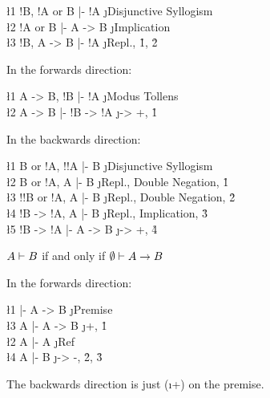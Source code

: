 \documentclass[class=cs245,notes,leqno]{agony}
\begin{document}
\begin{theorem}
\end{theorem}
\begin{prf}
  \begin{deduce}
    \l1 !B, !A or B |- !A     \j {Disjunctive Syllogism} \\
    \l2 !A or B     |- A -> B \j {Implication}           \\
    \l3 !B, A -> B  |- !A     \j {Repl., \r1, \r2}
  \end{deduce}
\end{prf}

\begin{theorem}[Contrapositive]
\end{theorem}
\begin{prf}
  In the forwards direction:
  \begin{deduce}
    \l1 A -> B, !B |- !A       \j {Modus Tollens} \\
    \l2 A -> B     |- !B -> !A \j {-> +, \r1}
  \end{deduce}
  In the backwards direction:
  \begin{deduce}
    \l1 B or !A, !!A |- B      \j {Disjunctive Syllogism}       \\
    \l2 B or !A, A   |- B      \j {Repl., Double Negation, \r1} \\
    \l3 !!B or !A, A |- B      \j {Repl., Double Negation, \r2} \\
    \l4 !B -> !A, A  |- B      \j {Repl., Implication, \r3}     \\
    \l5 !B -> !A     |- A -> B \j {-> +, \r4}
  \end{deduce}
\end{prf}

\begin{theorem}[Affirmation]
  $A \vdash B$ if and only if $\emptyset \vdash A \to B$
\end{theorem}
\begin{prf}
  In the forwards direction:
  \begin{deduce}
    \l1 \0 |- A -> B \j {Premise}        \\
    \l3 A  |- A -> B \j {+, \r1}         \\
    \l2 A  |- A      \j {Ref}            \\
    \l4 A  |- B      \j {-> -, \r2, \r3}
  \end{deduce}
  The backwards direction is just (\i +) on the premise.
\end{prf}
\end{document}
